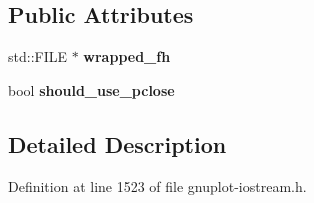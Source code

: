 \subsection*{Public Attributes}
\begin{DoxyCompactItemize}
\item 
std\+::\+F\+I\+LE $\ast$ {\bfseries wrapped\+\_\+fh}\hypertarget{structgnuplotio_1_1_file_handle_wrapper_adcb58bfcd9dbdba000a7e7395bee2ef9}{}\label{structgnuplotio_1_1_file_handle_wrapper_adcb58bfcd9dbdba000a7e7395bee2ef9}

\item 
bool {\bfseries should\+\_\+use\+\_\+pclose}\hypertarget{structgnuplotio_1_1_file_handle_wrapper_a11b63ed64cf53167e26c5273778d90ea}{}\label{structgnuplotio_1_1_file_handle_wrapper_a11b63ed64cf53167e26c5273778d90ea}

\end{DoxyCompactItemize}


\subsection{Detailed Description}


Definition at line 1523 of file gnuplot-\/iostream.\+h.

